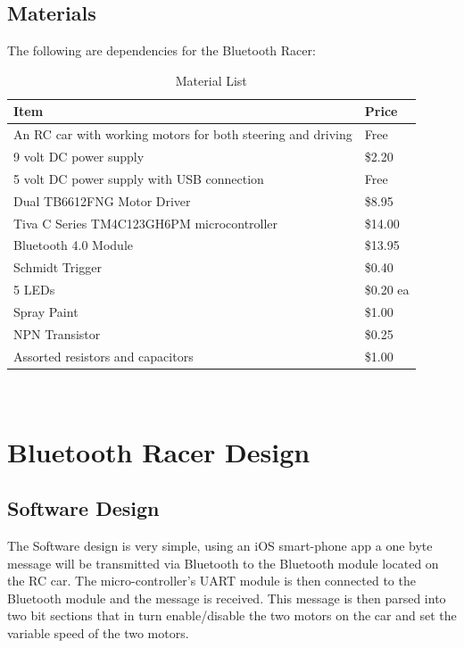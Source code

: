 \documentclass[12pt]{article}
\begin{document}
\subsection{Materials}
The following are dependencies for the Bluetooth Racer:
\begin{table}[H]
\centering
\caption{Material List}
\begin{tabular}{ll}\\
\hline
Item                                                        & Price     \\ \hline
An RC car with working motors for both steering and driving & Free      \\ \hline
9 volt DC power supply                                      & \$2.20    \\ \hline
5 volt DC power supply with USB connection                  & Free      \\ \hline
Dual TB6612FNG Motor Driver                                 & \$8.95    \\ \hline
Tiva C Series TM4C123GH6PM microcontroller                  & \$14.00   \\ \hline
Bluetooth 4.0 Module                                        & \$13.95   \\ \hline
Schmidt Trigger                                             & \$0.40    \\ \hline
5 LEDs                                                      & \$0.20 ea \\ \hline
Spray Paint                                                 & \$1.00    \\ \hline
NPN Transistor                                              & \$0.25    \\ \hline
Assorted resistors and capacitors                           & \$1.00    \\ \hline
\end{tabular}\\
\end{table}

\section{Bluetooth Racer Design}

\subsection{Software Design}
The Software design is very simple, using an iOS smart-phone app a one byte message will be transmitted via Bluetooth to the Bluetooth module located on the RC car. The micro-controller's UART module is then connected to the Bluetooth module and the message is received. This message is then parsed into two bit sections that in turn enable/disable the two motors on the car and set the variable speed of the two motors. \\
\end{document}
